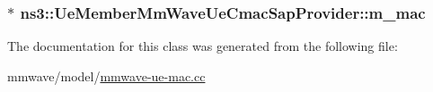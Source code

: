 \subsubsection[{\texorpdfstring{m\+\_\+mac}{m_mac}}]{$\ast$ ns3\+::\+Ue\+Member\+Mm\+Wave\+Ue\+Cmac\+Sap\+Provider\+::m\+\_\+mac\hspace{0.3cm}{\ttfamily [private]}}\hypertarget{classns3_1_1UeMemberMmWaveUeCmacSapProvider_a399a841f2fe1c2bd9c1a726c266f82c0}{}\label{classns3_1_1UeMemberMmWaveUeCmacSapProvider_a399a841f2fe1c2bd9c1a726c266f82c0}


The documentation for this class was generated from the following file\+:\begin{DoxyCompactItemize}
\item 
mmwave/model/\hyperlink{mmwave-ue-mac_8cc}{mmwave-\/ue-\/mac.\+cc}\end{DoxyCompactItemize}
